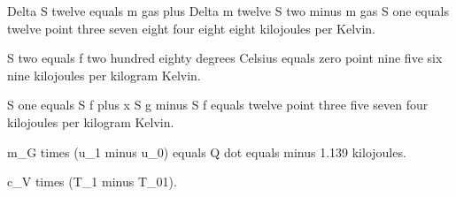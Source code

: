 Delta S twelve equals m gas plus Delta m twelve S two minus m gas S one equals twelve point three seven eight four eight eight kilojoules per Kelvin.

S two equals f two hundred eighty degrees Celsius equals zero point nine five six nine kilojoules per kilogram Kelvin.

S one equals S f plus x S g minus S f equals twelve point three five seven four kilojoules per kilogram Kelvin.

m_G times (u_1 minus u_0) equals Q dot equals minus 1.139 kilojoules.

c_V times (T_1 minus T_01).